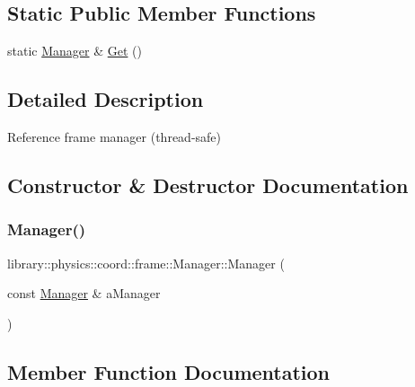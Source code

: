\subsection*{Static Public Member Functions}
\begin{DoxyCompactItemize}
\item 
static \hyperlink{classlibrary_1_1physics_1_1coord_1_1frame_1_1_manager}{Manager} \& \hyperlink{classlibrary_1_1physics_1_1coord_1_1frame_1_1_manager_ab17540188339548c7235a21236f8118e}{Get} ()
\end{DoxyCompactItemize}


\subsection{Detailed Description}
Reference frame manager (thread-\/safe) 

\subsection{Constructor \& Destructor Documentation}
\mbox{\label{classlibrary_1_1physics_1_1coord_1_1frame_1_1_manager_a2a044628916a829eeaf4da33c2b187b3}} 
\subsubsection{\texorpdfstring{Manager()}{Manager()}}
{\footnotesize\ttfamily library\+::physics\+::coord\+::frame\+::\+Manager\+::\+Manager (\begin{DoxyParamCaption}\item[{const \hyperlink{classlibrary_1_1physics_1_1coord_1_1frame_1_1_manager}{Manager} \&}]{a\+Manager }\end{DoxyParamCaption})\hspace{0.3cm}{\ttfamily [delete]}}



\subsection{Member Function Documentation}
\mbox{\label{classlibrary_1_1physics_1_1coord_1_1frame_1_1_manager_a1c506ae3841eaa03d2629df356ec8e28}} 
